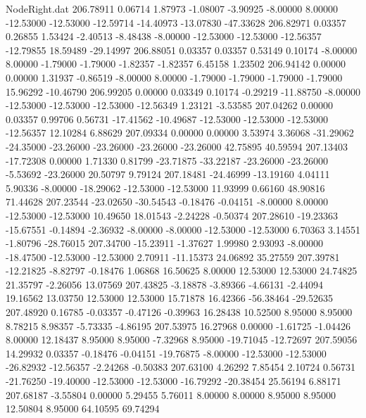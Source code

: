 \begin{filecontents}{NodeRight.dat}
 206.78911    0.06714    1.87973    -1.08007   -3.90925   -8.00000    8.00000  -12.53000  -12.53000  -12.59714  -14.40973  -13.07830  -47.33628
 206.82971    0.03357    0.26855     1.53424   -2.40513   -8.48438   -8.00000  -12.53000  -12.53000  -12.56357  -12.79855   18.59489  -29.14997
 206.88051    0.03357    0.03357     0.53149    0.10174   -8.00000    8.00000   -1.79000   -1.79000   -1.82357   -1.82357    6.45158    1.23502
 206.94142    0.00000    0.00000     1.31937   -0.86519   -8.00000    8.00000   -1.79000   -1.79000   -1.79000   -1.79000   15.96292  -10.46790
 206.99205    0.00000    0.03349     0.10174   -0.29219  -11.88750   -8.00000  -12.53000  -12.53000  -12.53000  -12.56349    1.23121   -3.53585
 207.04262    0.00000    0.03357     0.99706    0.56731  -17.41562  -10.49687  -12.53000  -12.53000  -12.53000  -12.56357   12.10284    6.88629
 207.09334    0.00000    0.00000     3.53974    3.36068  -31.29062  -24.35000  -23.26000  -23.26000  -23.26000  -23.26000   42.75895   40.59594
 207.13403  -17.72308    0.00000     1.71330    0.81799  -23.71875  -33.22187  -23.26000  -23.26000   -5.53692  -23.26000   20.50797    9.79124
 207.18481  -24.46999  -13.19160     4.04111    5.90336   -8.00000  -18.29062  -12.53000  -12.53000   11.93999    0.66160   48.90816   71.44628
 207.23544  -23.02650  -30.54543    -0.18476   -0.04151   -8.00000    8.00000  -12.53000  -12.53000   10.49650   18.01543   -2.24228   -0.50374
 207.28610  -19.23363  -15.67551    -0.14894   -2.36932   -8.00000   -8.00000  -12.53000  -12.53000    6.70363    3.14551   -1.80796  -28.76015
 207.34700  -15.23911   -1.37627     1.99980    2.93093   -8.00000  -18.47500  -12.53000  -12.53000    2.70911  -11.15373   24.06892   35.27559
 207.39781  -12.21825   -8.82797    -0.18476    1.06868   16.50625    8.00000   12.53000   12.53000   24.74825   21.35797   -2.26056   13.07569
 207.43825   -3.18878   -3.89366    -4.66131   -2.44094   19.16562   13.03750   12.53000   12.53000   15.71878   16.42366  -56.38464  -29.52635
 207.48920    0.16785   -0.03357    -0.47126   -0.39963   16.28438   10.52500    8.95000    8.95000    8.78215    8.98357   -5.73335   -4.86195
 207.53975   16.27968    0.00000    -1.61725   -1.04426    8.00000   12.18437    8.95000    8.95000   -7.32968    8.95000  -19.71045  -12.72697
 207.59056   14.29932    0.03357    -0.18476   -0.04151  -19.76875   -8.00000  -12.53000  -12.53000  -26.82932  -12.56357   -2.24268   -0.50383
 207.63100    4.26292    7.85454     2.10724    0.56731  -21.76250  -19.40000  -12.53000  -12.53000  -16.79292  -20.38454   25.56194    6.88171
 207.68187   -3.55804    0.00000     5.29455    5.76011    8.00000    8.00000    8.95000    8.95000   12.50804    8.95000   64.10595   69.74294

\end{filecontents}
